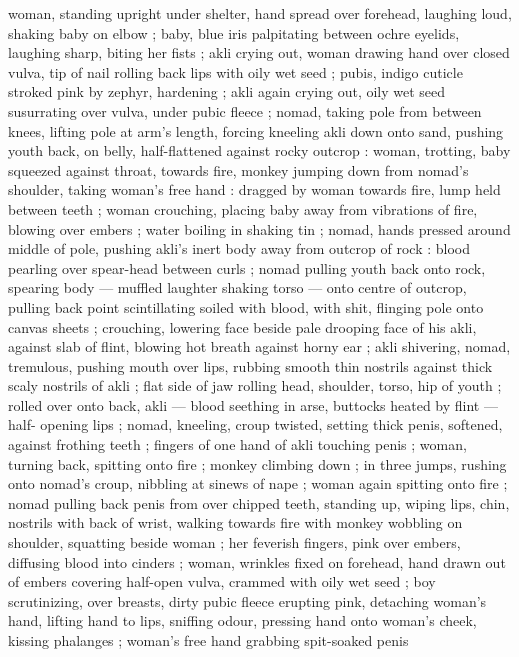 woman, standing upright under shelter, hand spread over forehead, 
laughing loud, shaking baby on elbow ; baby, blue iris palpitating 
between ochre eyelids, laughing sharp, biting her fists ; akli crying 
out, woman drawing hand over closed vulva, tip of nail rolling back 
lips with oily wet seed ; pubis, indigo cuticle stroked pink by zephyr, 
hardening ; akli again crying out, oily wet seed susurrating over 
vulva, under pubic fleece ; nomad, taking pole from between knees, 
lifting pole at arm's length, forcing kneeling akli down onto sand, 
pushing youth back, on belly, half-flattened against rocky outcrop : 
woman, trotting, baby squeezed against throat, towards fire, monkey 
jumping down from nomad's shoulder, taking woman's free hand : 
dragged by woman towards fire, lump held between teeth ; woman 
crouching, placing baby away from vibrations of fire, blowing over 
embers ; water boiling in shaking tin ; nomad, hands pressed around 
middle of pole, pushing akli's inert body away from outcrop of rock 
: blood pearling over spear-head between curls ; nomad pulling 
youth back onto rock, spearing body --- muffled laughter shaking 
torso --- onto centre of outcrop, pulling back point scintillating 
soiled with blood, with shit, flinging pole onto canvas sheets ; 
crouching, lowering face beside pale drooping face of his akli, 
against slab of flint, blowing hot breath against horny ear ; akli 
shivering, nomad, tremulous, pushing mouth over lips, rubbing 
smooth thin nostrils against thick scaly nostrils of akli ; flat side of 
jaw rolling head, shoulder, torso, hip of youth ; rolled over onto back, 
akli --- blood seething in arse, buttocks heated by flint --- half- 
opening lips ; nomad, kneeling, croup twisted, setting thick penis, 
softened, against frothing teeth ; fingers of one hand of akli 
touching penis ; woman, turning back, spitting onto fire ; monkey 
climbing down ; in three jumps, rushing onto nomad's croup, nibbling 
at sinews of nape ; woman again spitting onto fire ; nomad pulling 
back penis from over chipped teeth, standing up, wiping lips, chin, 
nostrils with back of wrist, walking towards fire with monkey wobbling 
on shoulder, squatting beside woman ; her feverish fingers, pink over 
embers, diffusing blood into cinders ; woman, wrinkles fixed on 
forehead, hand drawn out of embers covering half-open vulva, 
crammed with oily wet seed ; boy scrutinizing, over breasts, dirty 
pubic fleece erupting pink, detaching woman's hand, lifting hand to 
lips, sniffing odour, pressing hand onto woman's cheek, kissing 
phalanges ; woman's free hand grabbing spit-soaked penis 
